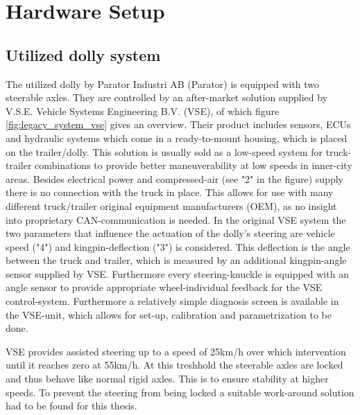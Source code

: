 \documentclass[ExampleMasters.tex]{subfiles}
\begin{document}
\clearpage


\chapter{Hardware Setup}
\label{chap:hardware_setup}
\section{Utilized dolly system}
\label{sec:dolly_system}
The utilized dolly by Parator Industri AB (Parator) is equipped with two steerable axles. They are controlled by an after-market solution supplied by V.S.E. Vehicle Systems Engineering B.V. (VSE), of which figure \ref{fig:legacy_system_vse} gives an overview. Their product includes sensors, ECUs and hydraulic systems which come in a ready-to-mount housing, which is placed on the trailer/dolly. This solution is usually sold as a low-speed system for truck-trailer combinations to provide better maneuverability at low speeds in inner-city areas. Besides electrical power and compressed-air (see "2" in the figure) supply there is no connection with the truck in place. This allows for use with many different truck/trailer original equipment manufacturers (OEM), as no insight into proprietary CAN-communication is needed. In the original VSE system the two parameters that influence the actuation of the dolly's steering are vehicle speed ("4") and kingpin-deflection ("3") is considered. This deflection is the angle between the truck and trailer, which is measured by an additional kingpin-angle sensor supplied by VSE. Furthermore every steering-knuckle is equipped with an angle sensor to provide appropriate wheel-individual feedback for the VSE control-system. Furthermore a relatively simple diagnosis screen is available in the VSE-unit, which allows for set-up, calibration and parametrization to be done.\cite{dolly_datasheet}

VSE provides assisted steering up to a speed of 25km/h over which intervention until it reaches zero at 55km/h. At this treshhold the steerable axles are locked and thus behave like normal rigid axles. This is to ensure stability at higher speeds.\cite{dolly_datasheet} To prevent the steering from being locked a suitable work-around solution had to be found for this thesis. 
\end{document}

